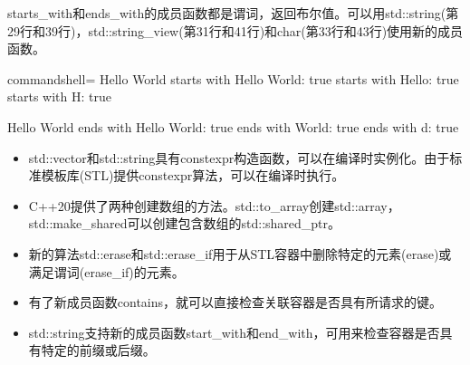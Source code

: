 starts\_with和ends\_with的成员函数都是谓词，返回布尔值。可以用std::string(第29行和39行)，std::string\_view(第31行和41行)和char(第33行和43行)使用新的成员函数。

\begin{tcblisting}{commandshell={}}
Hello World
            starts with Hello World: true
            starts with Hello: true
            starts with H: true
            
Hello World
            ends with Hello World: true
            ends with World: true
            ends with d: true
\end{tcblisting}

\begin{tcolorbox}[breakable,enhanced jigsaw,colback=mygreen!5!white,colframe=mygreen!75!black,title={总结}]
	
\begin{itemize}
\item 
std::vector和std::string具有constexpr构造函数，可以在编译时实例化。由于标准模板库(STL)提供constexpr算法，可以在编译时执行。

\item 
C++20提供了两种创建数组的方法。std::to\_array创建std::array，std::make\_shared可以创建包含数组的std::shared\_ptr。

\item 
新的算法std::erase和std::erase\_if用于从STL容器中删除特定的元素(erase)或满足谓词(erase\_if)的元素。

\item 
有了新成员函数contains，就可以直接检查关联容器是否具有所请求的键。

\item 
std::string支持新的成员函数start\_with和end\_with，可用来检查容器是否具有特定的前缀或后缀。
\end{itemize}
	
\end{tcolorbox}


\newpage


















